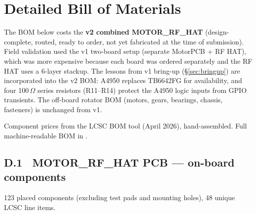 \chapter{Detailed Bill of Materials}
\label{app:bom}

The BOM below costs the \textbf{v2 combined MOTOR\_RF\_HAT} (design-complete, routed, ready to order, not yet fabricated at the time of submission). Field validation used the v1 two-board setup (separate MotorPCB + RF HAT), which was more expensive because each board was ordered separately and the RF HAT uses a 6-layer stackup. The lessons from v1 bring-up (\S\ref{sec:bringup}) are incorporated into the v2 BOM: A4950 replaces TB6642FG for availability, and four 100\,$\Omega$ series resistors (R11--R14) protect the A4950 logic inputs from GPIO transients. The off-board rotator BOM (motors, gears, bearings, chassis, fasteners) is unchanged from v1.

Component prices from the LCSC BOM tool (April 2026), hand-assembled. Full machine-readable BOM in .

\section*{D.1 \ MOTOR\_RF\_HAT PCB --- on-board components}

123 placed components (excluding test pads and mounting holes), 48 unique LCSC line items.

